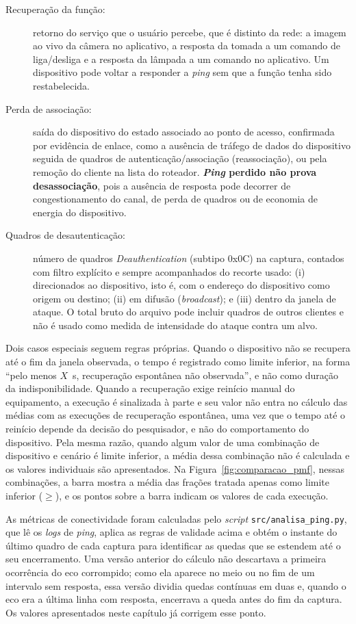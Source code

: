 \begin{description}
    \item[Recuperação da função:] retorno do serviço que o usuário percebe, que é distinto da rede: a imagem ao vivo da câmera no aplicativo, a resposta da tomada a um comando de liga/desliga e a resposta da lâmpada a um comando no aplicativo. Um dispositivo pode voltar a responder a \textit{ping} sem que a função tenha sido restabelecida.
    \item[Perda de associação:] saída do dispositivo do estado associado ao ponto de acesso, confirmada por evidência de enlace, como a ausência de tráfego de dados do dispositivo seguida de quadros de autenticação/associação (reassociação), ou pela remoção do cliente na lista do roteador. \textbf{\textit{Ping} perdido não prova desassociação}, pois a ausência de resposta pode decorrer de congestionamento do canal, de perda de quadros ou de economia de energia do dispositivo.
    \item[Quadros de desautenticação:] número de quadros \textit{Deauthentication} (subtipo 0x0C) na captura, contados com filtro explícito e sempre acompanhados do recorte usado: (i) direcionados ao dispositivo, isto é, com o endereço do dispositivo como origem ou destino; (ii) em difusão (\textit{broadcast}); e (iii) dentro da janela de ataque. O total bruto do arquivo pode incluir quadros de outros clientes e não é usado como medida de intensidade do ataque contra um alvo.
\end{description}

Dois casos especiais seguem regras próprias. Quando o dispositivo não se recupera até o fim da janela observada, o tempo é registrado como limite inferior, na forma ``pelo menos $X$~s, recuperação espontânea não observada'', e não como duração da indisponibilidade. Quando a recuperação exige reinício manual do equipamento, a execução é sinalizada à parte e seu valor não entra no cálculo das médias com as execuções de recuperação espontânea, uma vez que o tempo até o reinício depende da decisão do pesquisador, e não do comportamento do dispositivo. Pela mesma razão, quando algum valor de uma combinação de dispositivo e cenário é limite inferior, a média dessa combinação não é calculada e os valores individuais são apresentados. Na Figura~\ref{fig:comparacao_pmf}, nessas combinações, a barra mostra a média das frações tratada apenas como limite inferior ($\geq$), e os pontos sobre a barra indicam os valores de cada execução.

As métricas de conectividade foram calculadas pelo \textit{script} \texttt{src/analisa\_ping.py}, que lê os \textit{logs} de \textit{ping}, aplica as regras de validade acima e obtém o instante do último quadro de cada captura para identificar as quedas que se estendem até o seu encerramento. Uma versão anterior do cálculo não descartava a primeira ocorrência do eco corrompido; como ela aparece no meio ou no fim de um intervalo sem resposta, essa versão dividia quedas contínuas em duas e, quando o eco era a última linha com resposta, encerrava a queda antes do fim da captura. Os valores apresentados neste capítulo já corrigem esse ponto.

